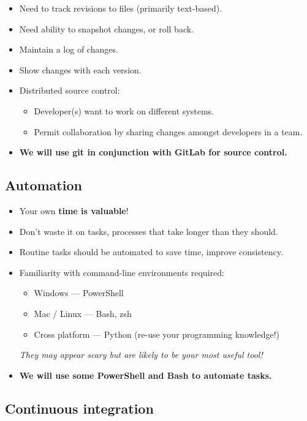 \documentclass[slides]{pgnotes}
\begin{document}
\begin{itemize}
\item Need to track revisions to files (primarily text-based).
\item Need ability to snapshot changes, or roll back.
\item Maintain a log of changes.
\item Show changes with each version.
\item Distributed source control:
  \begin{itemize}
  \item Developer(s) want to work on different systems.
  \item Permit collaboration by sharing changes amongst developers in a team.
  \end{itemize}
\item \textbf{We will use git in conjunction with GitLab for source control.}
\end{itemize}

\subsection{Automation}

\begin{itemize}
\item Your own \textbf{time is valuable}!
\item Don't waste it on tasks, processes that take longer than they should. 
\item Routine tasks should be automated to save time, improve consistency.
\item Familiarity with command-line environments required:
  \begin{itemize}
  \item Windows --- PowerShell
  \item Mac / Linux --- Bash, zsh
  \item Cross platform --- Python (re-use your programming knowledge!)
  \end{itemize}
  \textit{They may appear scary but are likely to be your most useful tool!}
\item \textbf{We will use some PowerShell and Bash to automate tasks.}
\end{itemize}


\subsection{Continuous integration}
\end{document}
